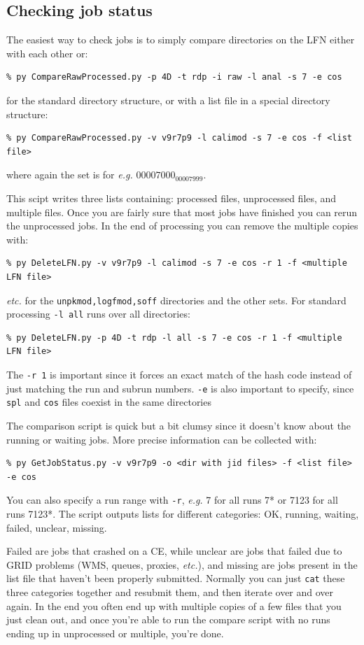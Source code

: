 \documentclass[11pt]{article}
\begin{document}
\subsection{Checking job status}

The easiest way to check jobs is to simply compare directories on the
LFN either with each other or:
\begin{verbatim}
% py CompareRawProcessed.py -p 4D -t rdp -i raw -l anal -s 7 -e cos
\end{verbatim}
for the standard directory structure, or with a list file in a special
directory structure: 
\begin{verbatim}
% py CompareRawProcessed.py -v v9r7p9 -l calimod -s 7 -e cos -f <list file>
\end{verbatim}
where again the set is for \textit{e.g.} $00007000_00007999$.

This scipt writes three lists containing: processed files, unprocessed
files, and multiple files. Once you are fairly sure that most jobs
have finished you can rerun the unprocessed jobs.
In the end of processing you can remove the multiple copies with:
\begin{verbatim}
% py DeleteLFN.py -v v9r7p9 -l calimod -s 7 -e cos -r 1 -f <multiple LFN file>
\end{verbatim}
\textit{etc.} for the \verb+unpkmod,logfmod,soff+ directories and the
other sets. For standard processing \verb+-l all+ runs over all
directories:
\begin{verbatim}
% py DeleteLFN.py -p 4D -t rdp -l all -s 7 -e cos -r 1 -f <multiple LFN file>
\end{verbatim}
The \verb+-r 1+ is important since it forces an exact match of the
hash code instead of just matching the run and subrun
numbers. \verb+-e+ is also important to specify, since \verb+spl+ and
\verb+cos+ files coexist in the same directories

The comparison script is quick but a bit clumsy since it doesn't know
about the running or waiting jobs. More precise information can be
collected with: 
\begin{verbatim}
% py GetJobStatus.py -v v9r7p9 -o <dir with jid files> -f <list file> -e cos
\end{verbatim}

You can also specify a run range with \verb+-r+, \textit{e.g.} 7 for
all runs 7* or 7123 for all runs 7123*. The script outputs lists for
different categories: OK, running, waiting, failed, unclear, missing.

Failed are jobs that crashed on a CE, while unclear are jobs that
failed due to GRID problems (WMS, queues, proxies, \textit{etc.}), and
missing are jobs present in the list file that haven't been properly
submitted. Normally you can just \verb+cat+ these three categories
together and resubmit them, and then iterate over and over again. In
the end you often end up with multiple copies of a few files that you
just clean out, and once you're able to run the compare script with no
runs ending up in unprocessed or multiple, you're done.
\end{document}
